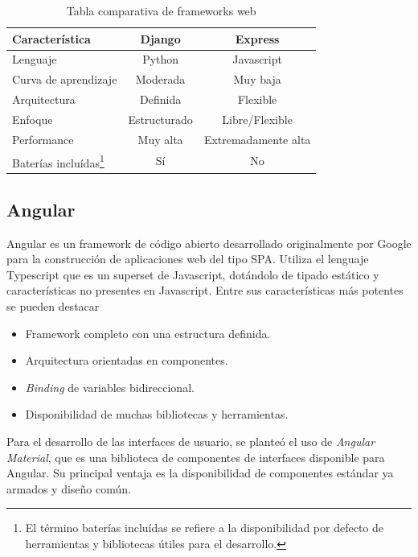 \begin{table}[h]
	\centering
	\caption[Tabla comparativa]{Tabla comparativa de frameworks web}
	\begin{tabular}{l c c}    
		\toprule
		\textbf{Característica} 	 & \textbf{Django} & \textbf{Express} \\
		\midrule
		Lenguaje & Python & Javascript \\		
		Curva de aprendizaje & Moderada & Muy baja			\\		
		Arquitectura & Definida & Flexible \\
		Enfoque & Estructurado & Libre/Flexible		\\
		Performance & Muy alta & Extremadamente alta \\
		Baterías incluídas\footnote{El término baterías incluídas se refiere a la disponibilidad por defecto de herramientas y bibliotecas útiles para el desarrollo.} & Sí & No \\
		\bottomrule
		\hline
	\end{tabular}
	\label{tab:peces}
\end{table}

\subsection{Angular}

Angular es un framework de código abierto desarrollado originalmente por Google para la construcción de aplicaciones web del tipo SPA\citep{ANGULAR:1}. Utiliza el lenguaje Typescript que es un superset de Javascript, dotándolo de tipado estático y características no presentes en Javascript. Entre sus características más potentes se pueden destacar\citep{ANGULAR:2}
\begin{itemize}
	\item Framework completo con una estructura definida.
	\item Arquitectura orientadas en componentes.
	\item \textit{Binding} de variables bidireccional.
	\item Disponibilidad de muchas bibliotecas y herramientas.
\end{itemize}

Para el desarrollo de las interfaces de usuario, se planteó el uso de \textit{Angular Material}, que es una biblioteca de componentes de interfaces disponible para Angular. Su principal ventaja es la disponibilidad de componentes estándar ya armados y diseño común\citep{ANGULAR:3}.

